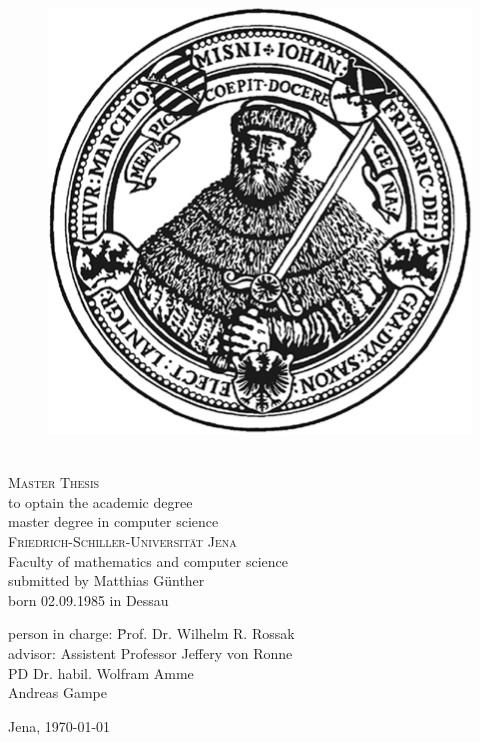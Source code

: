 \begin{titlepage}
 \begin{center}
  \vfill
  \begin{figure}[h]
	\begin{center}
 		\includegraphics[scale=0.6]{images/hanfried.png}
	\end{center}
  \end{figure}
  \vfill
  \Huge{\theme} \\[0.5em]
  \vfill
  \Large{\textsc{Master Thesis}} \\
  \vfill
  \large{to optain the academic degree \\master degree in computer science} \\
  \vfill
  \Large{\textsc{Friedrich-Schiller-Universität Jena} \\Faculty of mathematics and computer science} \\
  \vfill
  \normalsize{submitted by Matthias Günther\\born 02.09.1985 in Dessau}\\ 
\begin{center}\parbox{0cm}{\begin{tabbing}
person in charge: \= Prof. Dr. Wilhelm R. Rossak \\
advisor: 	\> Assistent Professor Jeffery von Ronne \\
\> PD Dr. habil. Wolfram Amme \\
\> Andreas Gampe \\
\end{tabbing}}\end{center}
  \vfill
  \normalsize{Jena, \today}
 \end{center}
\end{titlepage}

